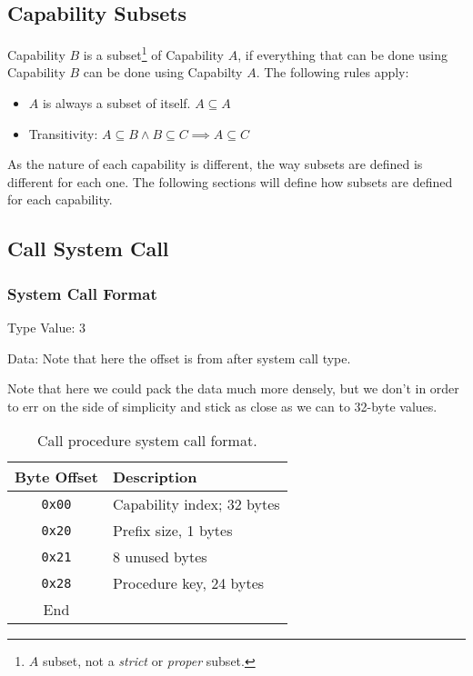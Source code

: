 \documentclass[english,a4paper]{article}
\let\oldparagraph\subsubsection
\renewcommand{\subsubsection}[1]{\oldparagraph{#1}\mbox{}}
\begin{document}
\subsection{Capability Subsets}\label{cap-subsets}

Capability $B$ is a subset\footnote{$A$ subset, not a \emph{strict} or
\emph{proper} subset.} of Capability $A$, if everything that can be done using
Capability $B$ can be done using Capabilty $A$. The following rules apply:

\begin{itemize}
  \item $A$ is always a subset of itself. $A \subseteq A$
  \item Transitivity: $A \subseteq B \land B \subseteq C \implies A
  \subseteq C$
\end{itemize}

As the nature of each capability is different, the way subsets are defined is
different for each one. The following sections will define how subsets are
defined for each capability.

\subsection{Call System Call}

\subsubsection{System Call Format}
Type Value: 3

Data: Note that here the offset is from after system call type.

Note that here we could pack the data much more densely, but we don't in order
to err on the side of simplicity and stick as close as we can to 32-byte values.

\begin{table}[H]
  \caption{Call procedure system call format.}
  \centering{}%
  \begin{tabularx}{\textwidth}{c|X}
    \hline
    Byte Offset & Description \\
    \hline
    \hline
    \texttt{0x00} & Capability index; 32 bytes \\
    \texttt{0x20} & Prefix size, 1 bytes \\
    \texttt{0x21} & 8 unused bytes \\
    \texttt{0x28} & Procedure key, 24 bytes \\
    \hline
    End &  \\
    \hline
  \end{tabularx}
\end{table}
\end{document}
